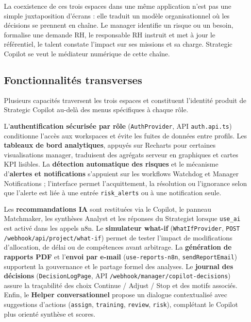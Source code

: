 La coexistence de ces trois espaces dans une même application n'est pas une simple juxtaposition d'écrans : elle traduit un modèle organisationnel où les décisions se prennent en chaîne. Le manager identifie un risque ou un besoin, formalise une demande RH, le responsable RH instruit et met à jour le référentiel, le talent constate l'impact sur ses missions et sa charge. Strategic Copilot se veut le médiateur numérique de cette chaîne.

\subsection{Fonctionnalités transverses}

Plusieurs capacités traversent les trois espaces et constituent l'identité produit de Strategic Copilot au-delà des menus spécifiques à chaque rôle.

L'\textbf{authentification sécurisée par rôle} (\texttt{AuthProvider}, API \texttt{auth.api.ts}) conditionne l'accès aux workspaces et évite les fuites de données entre profils. Les \textbf{tableaux de bord analytiques}, appuyés sur Recharts pour certaines visualisations manager, traduisent des agrégats serveur en graphiques et cartes KPI lisibles. La \textbf{détection automatique des risques} et le mécanisme d'\textbf{alertes et notifications} s'appuient sur les workflows Watchdog et Manager Notifications ; l'interface permet l'acquittement, la résolution ou l'ignorance selon que l'alerte est liée à une entrée \texttt{risk\_alerts} ou à une notification seule.

Les \textbf{recommandations IA} sont restituées via le Copilot, le panneau Matchmaker, les synthèses Analyst et les réponses du Strategist lorsque \texttt{use\_ai} est activé dans les appels n8n. Le \textbf{simulateur what-if} (\texttt{WhatIfProvider}, \texttt{POST /webhook/api/project/what-if}) permet de tester l'impact de modifications d'allocation, de délai ou de compétences avant arbitrage. La \textbf{génération de rapports PDF} et l'\textbf{envoi par e-mail} (\texttt{use-reports-n8n}, \texttt{sendReportEmail}) supportent la gouvernance et le partage formel des analyses. Le \textbf{journal des décisions} (\texttt{DecisionLogPage}, API \texttt{/webhook/manager/copilot-decisions}) assure la traçabilité des choix Continue / Adjust / Stop et des motifs associés. Enfin, le \textbf{Helper conversationnel} propose un dialogue contextualisé avec suggestions d'actions (\texttt{assign}, \texttt{training}, \texttt{review}, \texttt{risk}), complétant le Copilot plus orienté synthèse et scores.

